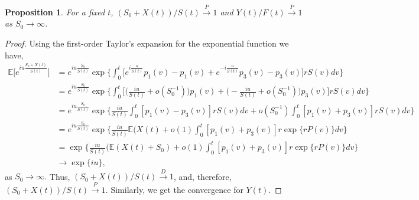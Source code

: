 \documentclass[10pt]{article}
\newtheorem{proposition}{Proposition}
\newcommand{\EE}{\mathbb{E}}
\begin{document}
\begin{proposition}
For a fixed $t$, $(S_0+X(t))/S(t)  \overset{P}{\longrightarrow} 1$ and $Y(t)/F(t) \overset{P}{\longrightarrow} 1$ as $S_0 \rightarrow \infty$.
\end{proposition}
\begin{proof}
Using the first-order Taylor's expansion for the exponential function we have,
\begin{equation*}
\begin{split}
\EE\Big[e^{iu \frac{S_0+X(t)}{S(t)}}\Big] & =e^{iu \frac{S_0}{S(t)}} \exp \Big\{  \int_0^t \Big[ e^{i \frac{u}{S(t)}}p_1(v) - p_1(v) + e^{-i \frac{u}{S(t)}}p_3(v) - p_3(v)\Big] r S(v) dv\Big\} \\
& = e^{iu \frac{S_0}{S(t)}}\exp \Big\{ \int_0^t \Big[ \Big(\frac{iu}{S(t)}  + o\left(S_0^{-1}\right) \Big) p_1(v) + \Big( - \frac{iu}{S(t)}  + o\left(S_0^{-1}\right) \Big) p_3(v)  \Big] r S(v) dv\Big\} \\
& = e^{iu \frac{S_0}{S(t)}}\exp \Big\{ \frac{iu}{S(t)} \int_0^t  [p_1(v) - p_3(v)] r S(v) dv  +  o (S_0^{-1})\int_0^t [p_1(v) + p_3(v)] r S(v) dv \Big\} \\
& = e^{iu \frac{S_0}{S(t)}}\exp \Big\{ \frac{iu}{S(t)} \EE(X(t)  +  o (1)\int_0^t [p_1(v) + p_3(v)] r \exp\{r P(v)\} dv \Big\} \\
& = \exp \Big\{ \frac{iu}{S(t)} (\EE(X(t)+S_0)  +  o (1)\int_0^t [p_1(v) + p_3(v)] r \exp\{r P(v)\} dv \Big\} \\
& \rightarrow \exp \Big\{iu\Big\},
\end{split}
\end{equation*}
as $S_0\to\infty.$
Thus, $(S_0+X(t))/S(t)  \overset{D}{\longrightarrow} 1$, and, therefore, $(S_0+X(t))/S(t)  \overset{P}{\longrightarrow} 1$. Similarly, we get the convergence for $Y(t)$.

\end{proof}
\end{document}
